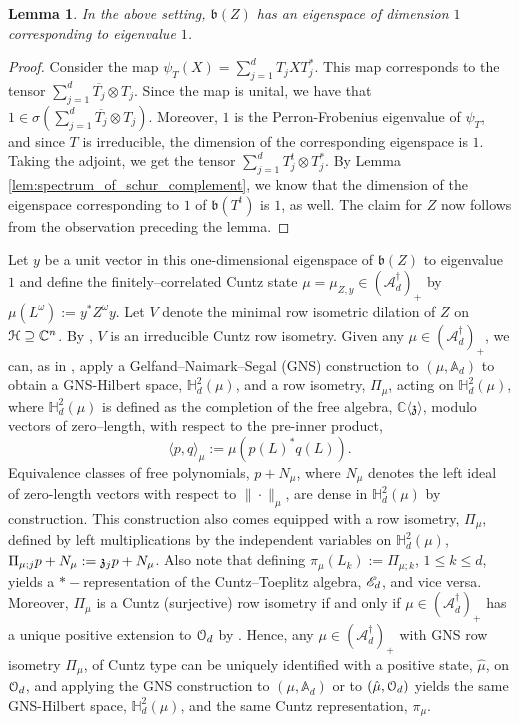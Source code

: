 \documentclass{article}
\newtheorem{lem}[thm]{Lemma}
\theoremstyle{definition}
\theoremstyle{remark}
\numberwithin{equation}{section}
\newcommand{\scr}{\ensuremath{\mathscr}}
\newcommand{\mf}{\ensuremath{\mathfrak}}
\newcommand{\om}{\ensuremath{\omega}}
\newcommand{\cuntz}{\ensuremath{\cO_d}}
\def\C{\mathbb{C}}
\def\fb{\mathfrak{b}}
\def\A{\mathbb{A} _d}
\def\fp{\mathbb{C} \langle \mathbb{\mathfrak{z}} \rangle }
\def\posncm{(\mathscr{A} _d ^\dagger) _+}
\def\hardy{\mathbb{H} ^2 _d}
\newcommand{\ip}[2]{\ensuremath{\langle {#1} , {#2} \rangle}}
\begin{document}
\begin{lem} \label{lem:Z_eigenspace}
In the above setting, $\fb(Z)$ has an eigenspace of dimension $1$ corresponding to eigenvalue $1$.
\end{lem}
\begin{proof}
Consider the map $\psi_T(X) = \sum_{j=1}^d T_j X T_j^*$. This map corresponds to the tensor $\sum_{j=1}^d \overline{T_j} \otimes T_j$. Since the map is unital, we have that $1 \in \sigma\left( \sum_{j=1}^d \overline{T_j} \otimes T_j \right)$. Moreover, $1$ is the Perron-Frobenius eigenvalue of $\psi_T$, and since $T$ is irreducible, the dimension of the corresponding eigenspace is $1$. Taking the adjoint, we get the tensor $\sum_{j=1}^d T_j^t \otimes T_j^*$. By Lemma \ref{lem:spectrum_of_schur_complement}, we know that the dimension of the eigenspace corresponding to $1$ of $\fb(T^t)$ is $1$, as well. The claim for $Z$ now follows from the observation preceding the lemma.
\end{proof}
Let $y$ be a unit vector in this one-dimensional eigenspace of $\fb (Z)$ to eigenvalue $1$ and define the finitely--correlated Cuntz state $\mu = \mu _{Z,y} \in \posncm$ by $\mu (L^\om ) := y^* Z^\om y$. Let $V$ denote the minimal row isometric dilation of $Z$ on $\cH \supseteq \C ^n$. By \cite[Theorem 6.5]{DKS-finrow}, $V$ is an irreducible Cuntz row isometry. Given any $\mu \in \posncm$, we can, as in \cite{JMS-ncratClark}, apply a Gelfand--Naimark--Segal (GNS) construction to $(\mu , \A)$ to obtain a GNS-Hilbert space, $\hardy (\mu)$, and a row isometry, $\Pi _\mu$, acting on $\hardy (\mu )$, where $\hardy (\mu )$ is defined as the completion of the free algebra, $\fp$, modulo vectors of zero--length, with respect to the pre-inner product, 
$$ \ip{p}{q}_\mu := \mu (p (L) ^* q(L) ). $$ Equivalence classes of free polynomials, $p + N_\mu$, where $N_\mu$ denotes the left ideal of zero-length vectors with respect to $\| \cdot \| _\mu$, are dense in $\hardy (\mu )$ by construction. This construction also comes equipped with a row isometry, $\Pi _\mu$, defined by left multiplications by the independent variables on $\hardy (\mu)$, $\Pi _{\mu ;j} p + N_\mu := \mf{z} _j p + N_\mu$. Also note that defining $\pi _\mu (L_k ) := \Pi _{\mu ; k }$, $1 \leq k \leq d$, yields a $*-$representation of the Cuntz--Toeplitz algebra, $\scr{E} _d$, and vice versa. Moreover, $\Pi _\mu$ is a Cuntz (surjective) row isometry if and only if $\mu \in \posncm$ has a unique positive extension to $\cuntz$ by \cite[Proposition 5.11]{JMT-ncFnM}. Hence, any $\mu \in \posncm$ with GNS row isometry $\Pi _\mu$, of Cuntz type can be uniquely identified with a positive state, $\hat{\mu}$, on $\cuntz$, and applying the GNS construction to $(\mu, \A)$ or to $(\hat{\mu}, \cuntz )$ yields the same GNS-Hilbert space, $\hardy (\mu )$, and the same Cuntz representation, $\pi _\mu$.
\end{document}
